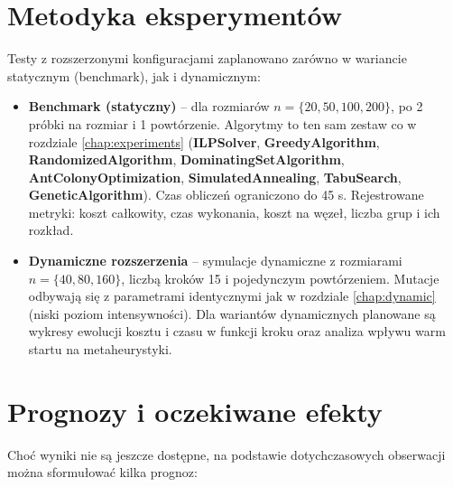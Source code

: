 \section{Metodyka eksperymentów}

Testy z rozszerzonymi konfiguracjami zaplanowano zarówno w wariancie statycznym (benchmark), jak i dynamicznym:

\begin{itemize}
\item \textbf{Benchmark (statyczny)} -- dla rozmiarów $n = \{20, 50, 100, 200\}$, po 2 próbki na rozmiar i 1 powtórzenie. Algorytmy to ten sam zestaw co w rozdziale \ref{chap:experiments} (\textbf{ILPSolver}, \textbf{GreedyAlgorithm}, \textbf{RandomizedAlgorithm}, \textbf{DominatingSetAlgorithm}, \textbf{AntColonyOptimization}, \textbf{SimulatedAnnealing}, \textbf{TabuSearch}, \textbf{GeneticAlgorithm}). Czas obliczeń ograniczono do 45 s. Rejestrowane metryki: koszt całkowity, czas wykonania, koszt na węzeł, liczba grup i ich rozkład.

\item \textbf{Dynamiczne rozszerzenia} -- symulacje dynamiczne z rozmiarami $n = \{40, 80, 160\}$, liczbą kroków 15 i pojedynczym powtórzeniem. Mutacje odbywają się z parametrami identycznymi jak w rozdziale \ref{chap:dynamic} (niski poziom intensywności). Dla wariantów dynamicznych planowane są wykresy ewolucji kosztu i czasu w funkcji kroku oraz analiza wpływu warm startu na metaheurystyki.
\end{itemize}

\section{Prognozy i oczekiwane efekty}

Choć wyniki nie są jeszcze dostępne, na podstawie dotychczasowych obserwacji można sformułować kilka prognoz:

